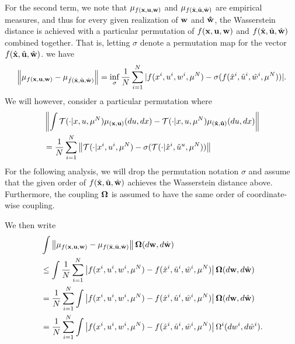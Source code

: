 \documentclass[twoside,11pt]{article}
\begin{document}
For the second term, we note that $\mu_{ f({\bf x},{\bf u},{\bf w})} $ and $ {\mu}_{f(\hat{\bf x}, \hat{\bf u} , \hat{\bf w}) }$ are empirical measures, and thus 
for every given realization of ${\bf w}$ and ${\bf \hat{w}}$, the Wasserstein distance is achieved with a particular permutation of ${ f({\bf x},{\bf u},{\bf w})}$ and ${{f}(\hat{\bf x}, \hat{\bf u} , \hat{\bf w}) }$ combined together. That is, letting $\sigma$ denote a permutation map for the vector ${{f}(\hat{\bf x}, \hat{\bf u} , \hat{\bf w}) }$. we have
\begin{align*}
 \left\|\mu_{ f({\bf x},{\bf u},{\bf w})} - {\mu}_{\hat{f}(\hat{\bf x}, \hat{\bf u} , \hat{\bf w}) }\right\|  = \inf_\sigma \frac{1}{N}\sum_{i=1}^N |f(x^i,u^i,w^i,\mu^N) - \sigma({f}(\hat{x}^i,\hat{u}^i,\hat{w}^i,\mu^N))|.
\end{align*}
 We will however, consider a particular permutation where 
\begin{align*}
&\left\| \int  \mathcal{T}(\cdot|x,u,\mu^N) \mu_{\bf (x,u)}(du,dx) - {\mathcal{T}}(\cdot|x,u,{\mu^N}) \mu_{(\bf \hat{x} , \hat{u})}(du,dx)\right\|\nonumber\\
&= \frac{1}{N}\sum_{i=1}^N \left\| \mathcal{T}(\cdot|x^i,u^i,\mu^N) -\sigma({\mathcal{T}}(\cdot|\hat{x}^i,\hat{u}^u,{\mu}^N))\right\|
\end{align*} 
For the following analysis, we will drop the permutation notation $\sigma$ and assume that the given order of ${f}(\hat{\bf x}, \hat{\bf u} , \hat{\bf w}) $ achieves the Wasserstein distance above. Furthermore, the coupling ${\bf \Omega}$ is assumed to have the same order of coordinate-wise coupling.

 We then write
\begin{align*}
 & \int  \left\|\mu_{ f({\bf x},{\bf u},{\bf w})} - {\mu}_{{f}(\hat{\bf x}, \hat{\bf u} , \hat{\bf w}) }\right\| {\bf \Omega}(d{\bf w}, d\hat{\bf w}) \nonumber\\
&\leq \int \frac{1}{N}\sum_{i=1}^N \left| f(x^i,u^i,w^i, \mu^N) - {f}(\hat{x}^i,\hat{u}^i,\hat{w}^i,{\mu^N}) \right|  {\bf \Omega}(d{\bf w}, d\hat{\bf w})\nonumber \\
& =  \frac{1}{N}\sum_{i=1}^N \int  \left| f(x^i,u^i,w^i, \mu^N) - {f}(\hat{x}^i,\hat{u}^i,\hat{w}^i,{\mu^N}) \right|  {\bf \Omega}(d{\bf w}, d\hat{\bf w})\nonumber \\
&= \frac{1}{N}\sum_{i=1}^N \int  \left| f(x^i,u^i,w^i, \mu^N) - {f}(\hat{x}^i,\hat{u}^i,\hat{w}^i,{\mu}^N) \right|  { \Omega^i}(dw^i, d\hat{w}^i). 
\end{align*}
\end{document}
